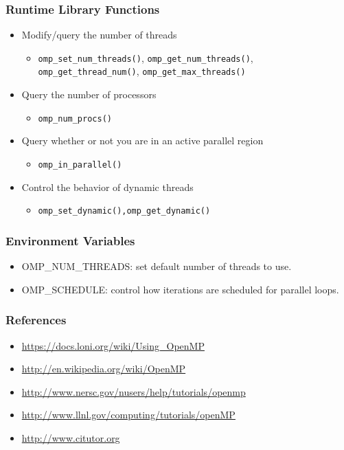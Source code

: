 \documentclass[c,mathserif,compress,xcolor=svgnames]{beamer}
\begin{document}
\begin{frame}
  \frametitle{\small Runtime Library Functions}
  \begin{itemize}
    \item Modify/query the number of threads
    \begin{itemize}
      \item \texttt{omp\_set\_num\_threads()}, \texttt{omp\_get\_num\_threads()}, \texttt{omp\_get\_thread\_num()}, \texttt{omp\_get\_max\_threads()}
    \end{itemize}
    \item Query the number of processors
    \begin{itemize}
      \item \texttt{omp\_num\_procs()}
    \end{itemize}
    \item Query whether or not you are in an active parallel region
    \begin{itemize}
      \item \texttt{omp\_in\_parallel()}
    \end{itemize}
    \item Control the behavior of dynamic threads
    \begin{itemize}
      \item \texttt{omp\_set\_dynamic(),omp\_get\_dynamic()}
    \end{itemize}
  \end{itemize}
\end{frame}

\begin{frame}
  \frametitle{\small Environment Variables}
  \begin{itemize}
    \item OMP\_NUM\_THREADS: set default number of threads to use.
    \item OMP\_SCHEDULE: control how iterations are scheduled for parallel loops.
  \end{itemize}
\end{frame}

\begin{frame}
  \frametitle{\small References}
  \begin{itemize}
    \item \url{https://docs.loni.org/wiki/Using_OpenMP}
    \item \url{http://en.wikipedia.org/wiki/OpenMP}
    \item \url{http://www.nersc.gov/nusers/help/tutorials/openmp}
    \item \url{http://www.llnl.gov/computing/tutorials/openMP}
    \item \url{http://www.citutor.org}
  \end{itemize}
\end{frame}
\end{document}
